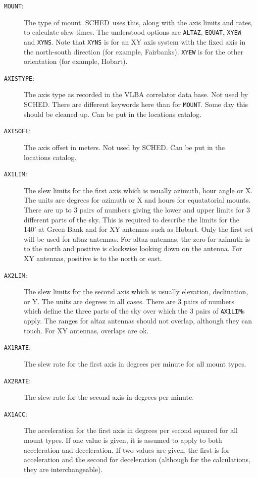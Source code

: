 \documentclass{report}
\newcommand{\sched}{{\sc SCHED}}
\newcommand{\schedb}{{\sc SCHED~}}
\begin{document}
\begin{description}
\item[{\tt MOUNT}:] The type of mount.  \schedb uses this, along with
the axis limits and rates, to calculate slew times.  The understood
options are {\tt ALTAZ}, {\tt EQUAT}, {\tt XYEW} and {\tt XYNS}.  Note
that {\tt XYNS} is for an XY axis system with the fixed axis in the
north-south direction (for example, Fairbanks).  {\tt XYEW}
is for the other orientation (for example, Hobart).

\item[{\tt AXISTYPE}:] The axis type as recorded in the VLBA
correlator data base.  Not used by \sched.  There are different
keywords here than for {\tt MOUNT}.  Some day this should be cleaned
up.  Can be put in the locations catalog.

\item[{\tt AXISOFF}:] The axis offset in meters.  Not used by \sched.
Can be put in the locations catalog.

\item [{\tt AX1LIM}:] The slew limits for the first axis which is
usually azimuth, hour angle or X.  The units are degrees for azimuth
or X and hours for equatatorial mounts.  There are up to 3 pairs of
numbers giving the lower and upper limits for 3 different parts of the
sky.  This is required to describe the limits for the 140' at Green
Bank and for XY antennas such as Hobart.  Only the first set will be
used for altaz antennas.  For altaz antennas, the zero for azimuth is
to the north and positive is clockwise looking down on the antenna.
For XY antennas, positive is to the north or east.

\item [{\tt AX2LIM}:] The slew limits for the second axis which is
usually elevation, declination, or Y.  The units are degrees in all
cases.  There are 3 pairs of numbers which define the three parts
of the sky over which the 3 pairs of {\tt AX1LIM}s apply.  The ranges
for altaz antennas should not overlap, although they can touch.  For
XY antennas, overlaps are ok.

\item [{\tt AX1RATE}:] The slew rate for the first axis in degrees
per minute for all mount types.

\item [{\tt AX2RATE}:] The slew rate for the second axis in degrees
per minute.

\item [{\tt AX1ACC}:] The acceleration for the first axis in degrees
per second squared for all mount types.  If one value is given, it is
assumed to apply to both acceleration and deceleration.  If two
values are given, the first is for acceleration and the second for
deceleration (although for the calculations, they are interchangeable).


\end{description}
\end{document}
